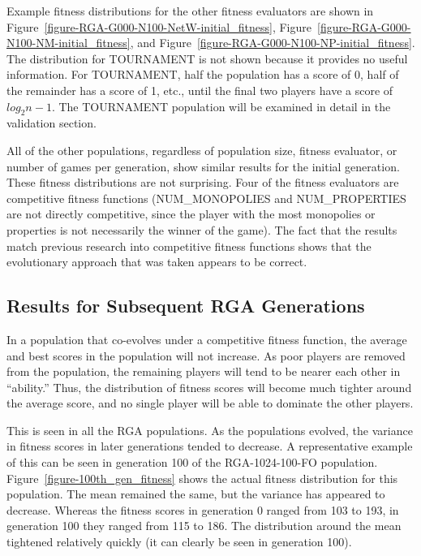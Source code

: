 Example fitness distributions for the other fitness evaluators are shown in
Figure~\ref{figure-RGA-G000-N100-NetW-initial_fitness},
Figure~\ref{figure-RGA-G000-N100-NM-initial_fitness}, and
Figure~\ref{figure-RGA-G000-N100-NP-initial_fitness}. The distribution for
TOURNAMENT is not shown because it provides no useful information. For
TOURNAMENT, half the population has a score of 0, half of the remainder has a
score of 1, etc., until the final two players have a score of \(log_{2} n-1\).
The TOURNAMENT population will be examined in detail in the validation section.

All of the other populations, regardless of population size, fitness evaluator,
or number of games per generation, show similar results for the initial
generation. These fitness distributions are not surprising. Four of the fitness
evaluators are competitive fitness functions (NUM\_MONOPOLIES and
NUM\_PROPERTIES are not directly competitive, since the player with the most
monopolies or properties is not necessarily the winner of the game). The fact
that the results match previous research into competitive fitness functions
shows that the evolutionary approach that was taken appears to be correct.

\subsection{Results for Subsequent RGA Generations}

In a population that co-evolves under a competitive fitness function, the
average and best scores in the population will not increase. As poor players are
removed from the population, the remaining players will tend to be nearer each
other in ``ability.'' Thus, the distribution of fitness scores will become much
tighter around the average score, and no single player will be able to dominate
the other players.

This is seen in all the RGA populations. As the populations evolved, the
variance in fitness scores in later generations tended to decrease. A
representative example of this can be seen in generation 100 of the
RGA-1024-100-FO population. Figure~\ref{figure-100th_gen_fitness} shows the
actual fitness distribution for this population. The mean remained the same, but
the variance has appeared to decrease. Whereas the fitness scores in generation
0 ranged from 103 to 193, in generation 100 they ranged from 115 to 186. The
distribution around the mean tightened relatively quickly (it can clearly be
seen in generation 100). 

